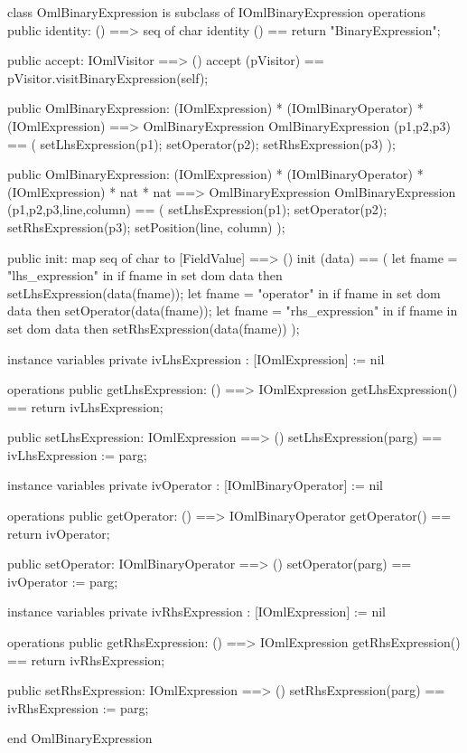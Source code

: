 \begin{vdm_al}
class OmlBinaryExpression is subclass of IOmlBinaryExpression
operations
  public identity: () ==> seq of char
  identity () == return "BinaryExpression";

  public accept: IOmlVisitor ==> ()
  accept (pVisitor) == pVisitor.visitBinaryExpression(self);

  public OmlBinaryExpression:
    (IOmlExpression) *
    (IOmlBinaryOperator) *
    (IOmlExpression) ==> OmlBinaryExpression
  OmlBinaryExpression (p1,p2,p3) == 
    ( setLhsExpression(p1);
      setOperator(p2);
      setRhsExpression(p3) );

  public OmlBinaryExpression:
    (IOmlExpression) *
    (IOmlBinaryOperator) *
    (IOmlExpression) *
    nat *
    nat ==> OmlBinaryExpression
  OmlBinaryExpression (p1,p2,p3,line,column) == 
    ( setLhsExpression(p1);
      setOperator(p2);
      setRhsExpression(p3);
      setPosition(line, column) );

  public init: map seq of char to [FieldValue] ==> ()
  init (data) ==
    ( let fname = "lhs_expression" in
        if fname in set dom data
        then setLhsExpression(data(fname));
      let fname = "operator" in
        if fname in set dom data
        then setOperator(data(fname));
      let fname = "rhs_expression" in
        if fname in set dom data
        then setRhsExpression(data(fname)) );

instance variables
  private ivLhsExpression : [IOmlExpression] := nil

operations
  public getLhsExpression: () ==> IOmlExpression
  getLhsExpression() == return ivLhsExpression;

  public setLhsExpression: IOmlExpression ==> ()
  setLhsExpression(parg) == ivLhsExpression := parg;

instance variables
  private ivOperator : [IOmlBinaryOperator] := nil

operations
  public getOperator: () ==> IOmlBinaryOperator
  getOperator() == return ivOperator;

  public setOperator: IOmlBinaryOperator ==> ()
  setOperator(parg) == ivOperator := parg;

instance variables
  private ivRhsExpression : [IOmlExpression] := nil

operations
  public getRhsExpression: () ==> IOmlExpression
  getRhsExpression() == return ivRhsExpression;

  public setRhsExpression: IOmlExpression ==> ()
  setRhsExpression(parg) == ivRhsExpression := parg;

end OmlBinaryExpression
\end{vdm_al}

